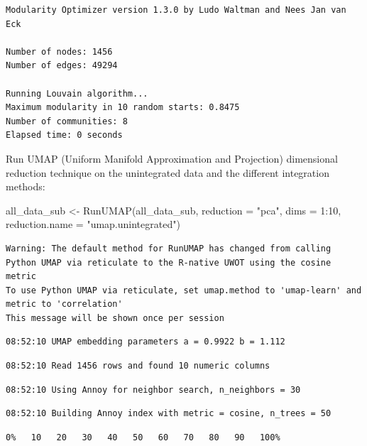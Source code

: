 \documentclass[
  letterpaper,
  DIV=11,
  numbers=noendperiod]{scrreprt}
\newenvironment{Shaded}{\begin{snugshade}}{\end{snugshade}}
\newcommand{\AttributeTok}[1]{\textcolor[rgb]{0.40,0.45,0.13}{#1}}
\newcommand{\DecValTok}[1]{\textcolor[rgb]{0.68,0.00,0.00}{#1}}
\newcommand{\FunctionTok}[1]{\textcolor[rgb]{0.28,0.35,0.67}{#1}}
\newcommand{\NormalTok}[1]{\textcolor[rgb]{0.00,0.23,0.31}{#1}}
\newcommand{\OtherTok}[1]{\textcolor[rgb]{0.00,0.23,0.31}{#1}}
\newcommand{\SpecialCharTok}[1]{\textcolor[rgb]{0.37,0.37,0.37}{#1}}
\newcommand{\StringTok}[1]{\textcolor[rgb]{0.13,0.47,0.30}{#1}}
\begin{document}
\begin{verbatim}
Modularity Optimizer version 1.3.0 by Ludo Waltman and Nees Jan van Eck

Number of nodes: 1456
Number of edges: 49294

Running Louvain algorithm...
Maximum modularity in 10 random starts: 0.8475
Number of communities: 8
Elapsed time: 0 seconds
\end{verbatim}

Run UMAP (Uniform Manifold Approximation and Projection) dimensional
reduction technique on the unintegrated data and the different
integration methods:

\begin{Shaded}
\begin{Highlighting}[]
\NormalTok{all\_data\_sub }\OtherTok{\textless{}{-}} \FunctionTok{RunUMAP}\NormalTok{(all\_data\_sub, }\AttributeTok{reduction =} \StringTok{"pca"}\NormalTok{, }\AttributeTok{dims =} \DecValTok{1}\SpecialCharTok{:}\DecValTok{10}\NormalTok{, }\AttributeTok{reduction.name =} \StringTok{"umap.unintegrated"}\NormalTok{)}
\end{Highlighting}
\end{Shaded}

\begin{verbatim}
Warning: The default method for RunUMAP has changed from calling Python UMAP via reticulate to the R-native UWOT using the cosine metric
To use Python UMAP via reticulate, set umap.method to 'umap-learn' and metric to 'correlation'
This message will be shown once per session
\end{verbatim}

\begin{verbatim}
08:52:10 UMAP embedding parameters a = 0.9922 b = 1.112
\end{verbatim}

\begin{verbatim}
08:52:10 Read 1456 rows and found 10 numeric columns
\end{verbatim}

\begin{verbatim}
08:52:10 Using Annoy for neighbor search, n_neighbors = 30
\end{verbatim}

\begin{verbatim}
08:52:10 Building Annoy index with metric = cosine, n_trees = 50
\end{verbatim}

\begin{verbatim}
0%   10   20   30   40   50   60   70   80   90   100%
\end{verbatim}
\end{document}
